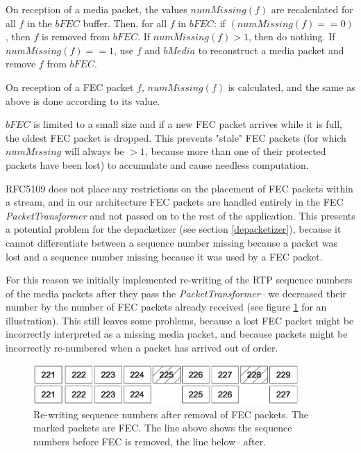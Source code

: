 \documentclass[twoside,openright,a4paper,12pt,english]{article}
\begin{document}
On reception of a media packet, the values $numMissing(f)$ are recalculated for
all $f$ in the $bFEC$ buffer. Then, for all $f$ in $bFEC$: if $(numMissing(f)
== 0)$, then $f$ is removed from $bFEC$. If $numMissing(f) > 1$, then do
nothing. If $numMissing(f) == 1$, use $f$ and $bMedia$ to reconstruct a media
packet and remove $f$ from $bFEC$.

On reception of a FEC packet $f$, $numMissing(f)$ is calculated, and the same
as above is done according to its value.

$bFEC$ is limited to a small size and if a new FEC packet arrives while it is
full, the oldest FEC packet is dropped. This prevents "stale" FEC packets (for
which $numMissing$ will always be $>1$, because more than one of their
protected packets have been lost) to accumulate and cause needless computation.


\bigskip
RFC5109 does not place any restrictions on the placement of FEC packets within
a stream, and in our architecture FEC packets are handled entirely in the FEC
\emph{PacketTransformer} and not passed on to the rest of the application. This
presents a potential problem for the depacketizer (see section
\ref{depacketizer}), because it cannot differentiate
between a sequence number missing because a packet was lost and a sequence number missing
because it was used by a FEC packet.

For this reason we initially implemented re-writing of the RTP sequence numbers of
the media packets after they pass the \emph{PacketTransformer}-- we decreased their
number by the number of FEC packets already received (see figure \ref{fec-seqs} for an
illustration). This still leaves some problems, because a lost FEC packet might be
incorrectly interpreted as a missing media packet, and because packets might be
incorrectly re-numbered when a packet has arrived out of order.

\begin{figure}[h]
   \centering
        \includegraphics[width=0.9\textwidth]{./pics/fec-seqs.eps}
        \caption{Re-writing sequence numbers after removal of FEC packets. The
        marked packets are FEC. The line above shows the sequence numbers
        before FEC is removed, the line below-- after.}
   \label{fec-seqs}
\end{figure}
\end{document}
